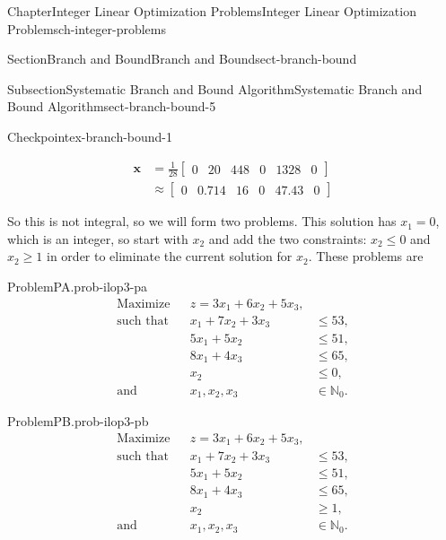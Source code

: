 \documentclass[oneside,10pt,]{book}
\numberwithin{equation}{section}
\newcommand{\amp}{&}
\begin{document}
\begin{chapterptx}{Chapter}{Integer Linear Optimization Problems}{}{Integer Linear Optimization Problems}{}{}{ch-integer-problems}
\begin{sectionptx}{Section}{Branch and Bound}{}{Branch and Bound}{}{}{sect-branch-bound}
\begin{subsectionptx}{Subsection}{Systematic Branch and Bound Algorithm}{}{Systematic Branch and Bound Algorithm}{}{}{sect-branch-bound-5}
\begin{inlineexercise}{Checkpoint}{}{ex-branch-bound-1}
\par
%
\begin{equation*}
\begin{aligned} \boldsymbol{x} \amp = \frac{1}{28}\left[ \begin{array}{rrr|rrr} 0 \amp 20 \amp 448 \amp 0 \amp 1328 \amp 0 \end{array} \right] \\ \amp  \approx \left[ \begin{array}{rrr|rrr} 0 \amp 0.714 \amp 16 \amp 0 \amp 47.43 \amp 0 \end{array} \right] \end{aligned}
\end{equation*}
%
\par
So this is not integral, so we will form two problems. This solution has \(x_1=0\), which is an integer, so start with \(x_2\) and add the two constraints: \(x_2 \leq 0\) and \(x_2 \geq 1\) in order to eliminate the current solution for \(x_2\). These problems are%
\begin{problem}{Problem}{PA.}{prob-ilop3-pa}%
%
\begin{equation*}
\begin{aligned} \text{Maximize} \amp\amp z = 3x_1 +6x_2 + 5 x_3, \amp\\ \text{such that} \amp\amp x_1 + 7 x_2 + 3x_3 \amp \leq 53, \\ \amp\amp 5 x_1 + 5 x_2 \amp \leq 51, \\ \amp\amp 8 x_1 + 4x_3 \amp \leq 65, \\ \amp \amp x_2 \amp \leq 0, \\ \text{and} \amp\amp x_1, x_2, x_3 \amp \in \mathbb{N}_{0}.
\end{aligned}
\end{equation*}
%
\end{problem}
\begin{problem}{Problem}{PB.}{prob-ilop3-pb}%
%
\begin{equation*}
\begin{aligned} \text{Maximize} \amp\amp z = 3x_1 +6x_2 + 5 x_3, \amp\\ \text{such that} \amp\amp x_1 + 7 x_2 + 3x_3 \amp \leq 53, \\ \amp\amp 5 x_1 + 5 x_2 \amp \leq 51, \\ \amp\amp 8 x_1 + 4x_3 \amp \leq 65, \\ \amp \amp x_2 \amp \geq 1, \\ \text{and} \amp\amp x_1, x_2, x_3 \amp \in \mathbb{N}_0.
\end{aligned}

\end{equation*}
\end{problem}
\end{inlineexercise}
\end{subsectionptx}
\end{sectionptx}
\end{chapterptx}
\end{document}
